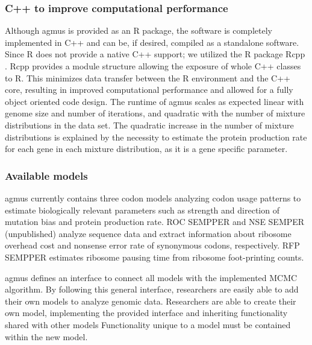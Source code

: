 \documentclass{bioinfo}
\newcommand{\package}{agmus } %
\begin{document}
\subsubsection*{C++ to improve computational performance}
Although \package is provided as an R package, the software is completely implemented in C++ and can be, if desired, compiled as a standalone software.
Since R does not provide a native C++ support; we utilized the R package Rcpp \citep{rcpp_package}. 
Rcpp provides a module structure allowing the exposure of whole C++ classes to R. 
This minimizes data transfer between the R environment and the C++ core, resulting in improved computational performance and allowed for a fully object oriented code design. 
The runtime of \package scales as expected linear with genome size and number of iterations, and quadratic with the number of mixture distributions in the data set. The quadratic increase in the number of mixture distributions is explained by the necessity to estimate the protein production rate for each gene in each mixture distribution, as it is a gene specific parameter.  

\subsubsection*{Available models}
\package currently contains three codon models analyzing codon usage patterns to estimate biologically relevant parameters such as strength and direction of mutation bias and protein production rate. 
ROC SEMPPER \cite{gilchrist2015} and NSE SEMPER (unpublished) analyze sequence data and extract information about ribosome overhead cost and nonsense error rate of synonymous codons, respectively. 
RFP SEMPPER estimates ribosome pausing time from ribosome foot-printing counts.


\package defines an interface to connect all models with the implemented MCMC algorithm. 
By following this general interface, researchers are easily able to add their own models to analyze genomic data.
Researchers are able to create their own model, implementing the provided interface and inheriting functionality shared with other models
Functionality unique to a model must be contained within the new model. 



\end{document}
